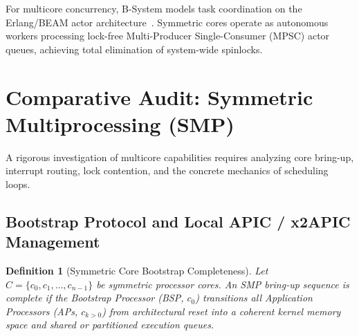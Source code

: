 \documentclass[10pt,journal,compsoc,twocolumn]{article}
\newtheorem{definition}{Definition}
\begin{document}
For multicore concurrency, B-System models task coordination on the Erlang/BEAM actor architecture~\cite{armstrong2003erlang}. Symmetric cores operate as autonomous workers processing lock-free Multi-Producer Single-Consumer (MPSC) actor queues, achieving total elimination of system-wide spinlocks.

\section{Comparative Audit: Symmetric Multiprocessing (SMP)}
\label{sec:smp}

A rigorous investigation of multicore capabilities requires analyzing core bring-up, interrupt routing, lock contention, and the concrete mechanics of scheduling loops.

\subsection{Bootstrap Protocol and Local APIC / x2APIC Management}

\begin{definition}[Symmetric Core Bootstrap Completeness]
Let $C = \{c_0, c_1, \dots, c_{n-1}\}$ be symmetric processor cores. An SMP bring-up sequence is complete if the Bootstrap Processor (BSP, $c_0$) transitions all Application Processors (APs, $c_{k > 0}$) from architectural reset into a coherent kernel memory space and shared or partitioned execution queues.
\end{definition}
\end{document}
